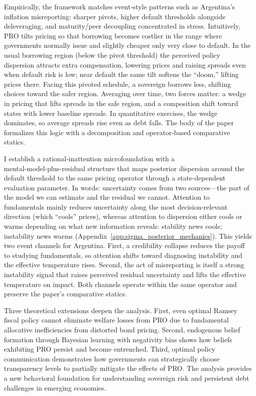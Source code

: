 \documentclass[12pt]{article}
\theoremstyle{plain}
\begin{document}
Empirically, the framework matches event‑style patterns such as Argentina’s
inflation misreporting: sharper pivots, higher default thresholds alongside
deleveraging, and maturity/peer decoupling concentrated in stress. Intuitively,
PRO tilts pricing so that borrowing becomes costlier in the range where
governments normally issue and slightly cheaper only very close to default. In
the usual borrowing region (below the pivot threshold) the perceived policy
dispersion attracts extra compensation, lowering prices and raising spreads
even when default risk is low; near default the same tilt softens the “doom,”
lifting prices there. Facing this pivoted schedule, a sovereign borrows less,
shifting choices toward the safer region. Averaging over time, two forces
matter: a wedge in pricing that lifts spreads in the safe region, and a
composition shift toward states with lower baseline spreads. In quantitative
exercises, the wedge dominates, so average spreads rise even as debt falls. The
body of the paper formalizes this logic with a decomposition and operator‑based
comparative statics.

I establish a rational‑inattention microfoundation with a
mental‑model‑plus‑residual structure that maps posterior dispersion around the
default threshold to the same pricing operator through a state‑dependent
evaluation parameter. In words: uncertainty comes from two sources—the part of
the model we can estimate and the residual we cannot. Attention to fundamentals
mainly reduces uncertainty along the most decision‑relevant direction (which
“cools” prices), whereas attention to dispersion either cools or warms
depending on what new information reveals: stability news cools; instability
news warms (Appendix~\ref{app:sigma_posterior_mechanics}). This yields two
event channels for Argentina. First, a credibility collapse reduces the payoff
to studying fundamentals, so attention shifts toward diagnosing instability and
the effective temperature rises. Second, the act of misreporting is itself a
strong instability signal that raises perceived residual uncertainty and lifts
the effective temperature on impact. Both channels operate within the same
operator and preserve the paper’s comparative statics.

Three theoretical extensions deepen the analysis. First, even optimal Ramsey
fiscal policy cannot eliminate welfare losses from PRO due to fundamental
allocative inefficiencies from distorted bond pricing. Second, endogenous
belief formation through Bayesian learning with negativity bias shows how
beliefs exhibiting PRO persist and become entrenched. Third, optimal policy
communication demonstrates how governments can strategically choose
transparency levels to partially mitigate the effects of PRO. The analysis
provides a new behavioral foundation for understanding sovereign risk and
persistent debt challenges in emerging economies.
\end{document}
